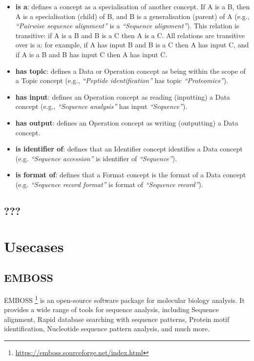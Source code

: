 \documentclass{scrartcl}
\begin{document}
\begin{itemize}
  \item \textbf{is a}: defines a concept as a specialisation of 
    another concept. If A is a B, then A is a specialisation (child) 
    of B, and B is a generalisation (parent) of A (e.g., 
    \textit{“Pairwise sequence alignment”} is a \textit{“Sequence alignment”}).
    This relation is transitive: if A is a B and B is a C then A is a C.
    All relations are transitive over is a: for example, if A 
    has input B and B is a C then A has input C, 
    and if A is a B and B has input C then A has input C.
  \item \textbf{has topic}: defines a Data or Operation concept as being 
    within the scope of a Topic concept (e.g., \textit{“Peptide identification”}
    has topic \textit{“Proteomics”}).
  \item \textbf{has input}: defines an Operation concept as reading (inputting) 
    a Data concept (e.g., \textit{“Sequence analysis”} has input 
    \textit{“Sequence”}).
  \item \textbf{has output}: defines an Operation concept as writing (outputting) 
    a Data concept.
  \item \textbf{is identifier of}: defines that an Identifier concept identifies 
    a Data concept (e.g. \textit{“Sequence accession”} 
    is identifier of \textit{“Sequence”}).
  \item \textbf{is format of}: defines that a Format concept is the format of a 
    Data concept (e.g. \textit{“Sequence record format”} is format 
    of \textit{“Sequence record”}).
\end{itemize}

\subsection{???}

\newpage

\section{Usecases}

\subsection{EMBOSS}
EMBOSS \footnote{\url{https://emboss.sourceforge.net/index.html}} is an open-source software package 
  for molecular biology analysis. It provides a wide range of tools for sequence analysis, 
  including Sequence alignment, Rapid database searching with sequence patterns, 
  Protein motif identification, Nucleotide sequence pattern analysis, and much more.
\end{document}
